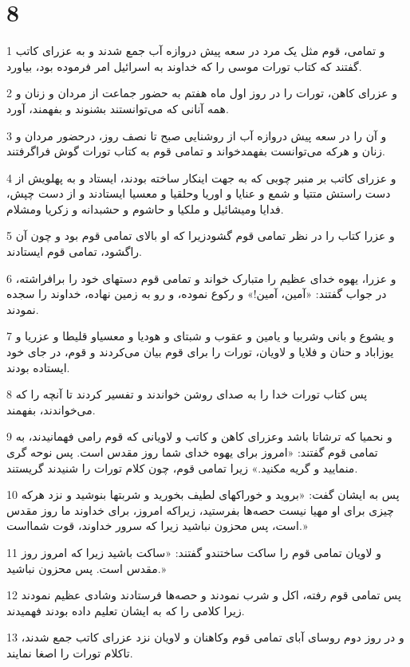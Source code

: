 \chapter{8}

\par 1 و تمامی، قوم مثل یک مرد در سعه پیش دروازه آب جمع شدند و به عزرای کاتب گفتند که کتاب تورات موسی را که خداوند به اسرائیل امر فرموده بود، بیاورد.
\par 2 و عزرای کاهن، تورات را در روز اول ماه هفتم به حضور جماعت از مردان و زنان و همه آنانی که می‌توانستند بشنوند و بفهمند، آورد.
\par 3 و آن را در سعه پیش دروازه آب از روشنایی صبح تا نصف روز، درحضور مردان و زنان و هر‌که می‌توانست بفهمدخواند و تمامی قوم به کتاب تورات گوش فراگرفتند.
\par 4 و عزرای کاتب بر منبر چوبی که به جهت اینکار ساخته بودند، ایستاد و به پهلویش از دست راستش متتیا و شمع و عنایا و اوریا وحلقیا و معسیا ایستادند و از دست چپش، فدایا ومیشائیل و ملکیا و حاشوم و حشبدانه و زکریا ومشلام.
\par 5 و عزرا کتاب را در نظر تمامی قوم گشودزیرا که او بالای تمامی قوم بود و چون آن راگشود، تمامی قوم ایستادند.
\par 6 و عزرا، یهوه خدای عظیم را متبارک خواند و تمامی قوم دستهای خود را برافراشته، در جواب گفتند: «آمین، آمین!» و رکوع نموده، و رو به زمین نهاده، خداوند را سجده نمودند.
\par 7 و یشوع و بانی وشربیا و یامین و عقوب و شبتای و هودیا و معسیاو قلیطا و عزریا و یوزاباد و حنان و فلایا و لاویان، تورات را برای قوم بیان می‌کردند و قوم، در جای خود ایستاده بودند.
\par 8 پس کتاب تورات خدا را به صدای روشن خواندند و تفسیر کردند تا آنچه را که می‌خواندند، بفهمند.
\par 9 و نحمیا که ترشاتا باشد وعزرای کاهن و کاتب و لاویانی که قوم رامی فهمانیدند، به تمامی قوم گفتند: «امروز برای یهوه خدای شما روز مقدس است. پس نوحه گری منمایید و گریه مکنید.» زیرا تمامی قوم، چون کلام تورات را شنیدند گریستند.
\par 10 پس به ایشان گفت: «بروید و خوراکهای لطیف بخورید و شربتها بنوشید و نزد هر‌که چیزی برای او مهیا نیست حصه‌ها بفرستید، زیراکه امروز، برای خداوند ما روز مقدس است، پس محزون نباشید زیرا که سرور خداوند، قوت شمااست.»
\par 11 و لاویان تمامی قوم را ساکت ساختندو گفتند: «ساکت باشید زیرا که امروز روز مقدس است. پس محزون نباشید.»
\par 12 پس تمامی قوم رفته، اکل و شرب نمودند و حصه‌ها فرستادند وشادی عظیم نمودند زیرا کلامی را که به ایشان تعلیم داده بودند فهمیدند.
\par 13 و در روز دوم روسای آبای تمامی قوم وکاهنان و لاویان نزد عزرای کاتب جمع شدند، تاکلام تورات را اصغا نمایند.
